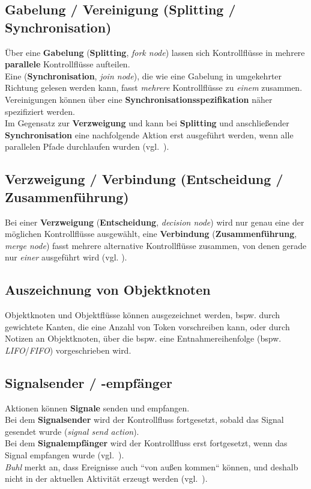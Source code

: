 \subsection{Gabelung / Vereinigung (Splitting / Synchronisation)}
Über eine \textbf{Gabelung} (\textbf{Splitting}, \textit{fork node}) lassen sich Kontrollflüsse in mehrere \textbf{parallele} Kontrollflüsse aufteilen.\\

\noindent
Eine  (\textbf{Synchronisation}, \textit{join node}), die wie eine Gabelung in umgekehrter Richtung gelesen werden kann, fasst \textit{mehrere} Kontrollflüsse zu \textit{einem} zusammen.\\
Vereinigungen können über eine \textbf{Synchronisationsspezifikation} näher spezifiziert werden.\\

\noindent
Im Gegensatz zur \textbf{Verzweigung} und  kann bei \textbf{Splitting} und anschließender \textbf{Synchronisation} eine nachfolgende Aktion erst ausgeführt werden, wenn alle parallelen Pfade durchlaufen wurden (vgl.~\cite[71]{Bal05}).

\subsection{Verzweigung / Verbindung (Entscheidung / Zusammenführung)}
Bei einer \textbf{Verzweigung} (\textbf{Entscheidung}, \textit{decision node}) wird nur genau eine der möglichen Kontrollflüsse ausgewählt, eine \textbf{Verbindung} (\textbf{Zusammenführung}, \textit{merge node}) fasst mehrere alternative  Kontrollflüsse zusammen, von denen gerade nur \textit{einer} ausgeführt wird (vgl. \cite[60]{Buh09}).

\subsection{Auszeichnung von Objektknoten}
Objektknoten und Objektflüsse können ausgezeichnet werden, bspw. durch gewichtete Kanten, die eine Anzahl von Token vorschreiben kann, oder durch Notizen an Objektknoten, über die bspw. eine Entnahmereihenfolge (bspw. \textit{LIFO}/\textit{FIFO}) vorgeschrieben wird.

\subsection{Signalsender / -empfänger}
Aktionen können \textbf{Signale} senden und empfangen.\\
Bei dem \textbf{Signalsender} wird der Kontrollfluss fortgesetzt, sobald das Signal gesendet wurde (\textit{signal send action}). \\
Bei dem \textbf{Signalempfänger} wird der Kontrollfluss erst fortgesetzt, wenn das Signal empfangen wurde (vgl.~\cite[76]{Bal05}).\\
\textit{Buhl} merkt an, dass Ereignisse auch ``von außen kommen`` können, und deshalb nicht in der aktuellen Aktivität erzeugt werden (vgl.~\cite[63]{Buh09}).


